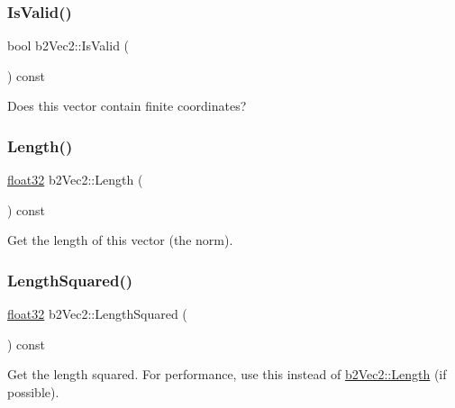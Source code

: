 \subsubsection{\texorpdfstring{IsValid()}{IsValid()}}
{\footnotesize\ttfamily bool b2\+Vec2\+::\+Is\+Valid (\begin{DoxyParamCaption}{ }\end{DoxyParamCaption}) const\hspace{0.3cm}{\ttfamily [inline]}}



Does this vector contain finite coordinates? 

\mbox{\label{structb2_vec2_a04cb9ac9e845a59f4212b2d7149fa3d9}} 
\subsubsection{\texorpdfstring{Length()}{Length()}}
{\footnotesize\ttfamily \mbox{\hyperlink{b2_settings_8h_aacdc525d6f7bddb3ae95d5c311bd06a1}{float32}} b2\+Vec2\+::\+Length (\begin{DoxyParamCaption}{ }\end{DoxyParamCaption}) const\hspace{0.3cm}{\ttfamily [inline]}}



Get the length of this vector (the norm). 

\mbox{\label{structb2_vec2_af8a081dac7eea7800fdbfbf95ac9e395}} 
\subsubsection{\texorpdfstring{LengthSquared()}{LengthSquared()}}
{\footnotesize\ttfamily \mbox{\hyperlink{b2_settings_8h_aacdc525d6f7bddb3ae95d5c311bd06a1}{float32}} b2\+Vec2\+::\+Length\+Squared (\begin{DoxyParamCaption}{ }\end{DoxyParamCaption}) const\hspace{0.3cm}{\ttfamily [inline]}}

Get the length squared. For performance, use this instead of \mbox{\hyperlink{structb2_vec2_a04cb9ac9e845a59f4212b2d7149fa3d9}{b2\+Vec2\+::\+Length}} (if possible). \mbox{\label{structb2_vec2_adda78c92f318fe53d8a53f9b5cfd8e41}} 
